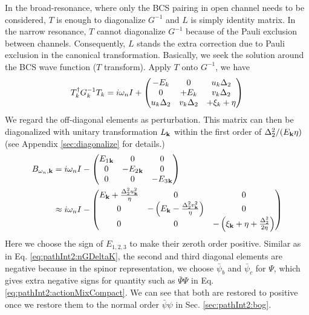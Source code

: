 In the broad-resonance, where only the BCS pairing in open channel needs to be considered, $T$ is enough to diagonalize $G^{-1}$ and $L$ is simply identity matrix.  %
In the narrow resonance, $T$ cannot diagonalize $G^{-1}$ because of the Pauli exclusion between channels.  Consequently, $L$ stands the extra correction due to Pauli exclusion in the canonical transformation. Basically, we seek the solution around the BCS wave function ($T$ transform). 
Apply $T$ onto $G^{-1}$, we have 
\begin{equation}\label{eq:pathInt2:G2}
T_k^{\dagger}G_k^{-1}T_k=i\omega_nI+\begin{pmatrix}-E_k&0&u_k\Delta_2\\0&+E_k&v_k\Delta_2\\u_k\Delta_2&v_k\Delta_2&+\xi_k+\eta\end{pmatrix}
\end{equation}
We regard the off-diagonal elements as perturbation.  This matrix can then be diagonalized with  unitary transformation $L_{\mathbf{k}}$ within the first order of $\Delta_{2}^{2}/(E_{\mathbf{k}}\eta)$  (see Appendix \ref{sec:diagonalize} for details.)
\begin{equation}\label{eq:pathInt2:Bapprox}
\begin{split}
B_{\omega_{n},\mathbf{k}}&=i\omega_{n}I-
	\begin{pmatrix}E_{1}{}_{\mathbf{k}}&0&0\\0&-E_{2}{}_{\mathbf{k}}&0\\0&0&-E_{3}{}_{\mathbf{k}}\end{pmatrix}\\
	&\approx{}i\omega_{n}I-
	\begin{pmatrix}E_{\mathbf{k}}+\frac{\Delta_{2}^{2}u_{\mathbf{k}}^{2}}{\eta}&0&0\\
	0&-\left(E_{\mathbf{k}}-\frac{\Delta_{2}^{2}v_{\mathbf{k}}^{2}}{\eta}\right)&0\\0&0&-\left(\xi_{\mathbf{k}}+\eta+\frac{\Delta_{2}^{2}}{2\eta}\right)\end{pmatrix}
\end{split}	
\end{equation}
Here we choose the sign of $E_{1,2,3}$  to make their zeroth order positive.  Similar as in Eq.  \ref{eq:pathInt2:nGDeltaK}, the second and third diagonal elements are negative because in the spinor representation, we choose $\bar{\psi}_{b}$ and $\bar{\psi}_{c}$ for $\Psi$, which gives extra negative signs for quantity such as $\bar\Psi\Psi$ in Eq. \ref{eq:pathInt2:actionMixCompact}.  We can see that both are restored to positive once we restore them to the normal order $\bar\psi\psi$ in Sec. \ref{sec:pathInt2:bog}.  %
